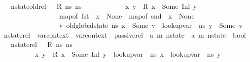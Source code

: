 \begin{isabellebody}
\ \ \ {\isachardoublequoteopen}nstate{\isacharunderscore}{\kern0pt}old{\isacharunderscore}{\kern0pt}rel\ {\isasymLambda}\ {\isasymLambda}{\isacharprime}{\kern0pt}\ R\ ns{}\ ns{}\ {\isacharequal}{\kern0pt}\ \isanewline
\ \ \ \ \ \ \ \ \ \ {\isacharparenleft}{\kern0pt}{\isasymforall}x\ y{\isachardot}{\kern0pt}\ \ R\ x\ {\isacharequal}{\kern0pt}\ Some\ {\isacharparenleft}{\kern0pt}Inl\ y{\isacharparenright}{\kern0pt}\ {\isasymlongrightarrow}\ \isanewline
\ \ \ \ \ \ \ \ \ \ \ \ \ \ \ \ \ {\isacharparenleft}{\kern0pt}map{\isacharunderscore}{\kern0pt}of\ {\isacharparenleft}{\kern0pt}fst\ {\isasymLambda}{\isacharparenright}{\kern0pt}\ x\ {\isasymnoteq}\ None\ {\isasymand}\ map{\isacharunderscore}{\kern0pt}of\ {\isacharparenleft}{\kern0pt}snd\ {\isasymLambda}{\isacharparenright}{\kern0pt}\ x\ {\isacharequal}{\kern0pt}\ None{\isacharparenright}{\kern0pt}\ {\isasymand}\isanewline
\ \ \ \ \ \ \ \ \ \ \ \ \ \ \ \ \ {\isacharparenleft}{\kern0pt}{\isasymexists}v{\isachardot}{\kern0pt}\ {\isacharparenleft}{\kern0pt}old{\isacharunderscore}{\kern0pt}global{\isacharunderscore}{\kern0pt}state\ ns{}{\isacharparenright}{\kern0pt}\ x\ {\isacharequal}{\kern0pt}\ Some\ v\ {\isasymand}\ lookup{\isacharunderscore}{\kern0pt}var\ {\isasymLambda}{\isacharprime}{\kern0pt}\ ns{}\ y\ {\isacharequal}{\kern0pt}\ Some\ v{\isacharparenright}{\kern0pt}{\isacharparenright}{\kern0pt}{\isachardoublequoteclose}\isanewline
\isanewline
{}\isamarkupfalse%
\ nstate{\isacharunderscore}{\kern0pt}rel\ {\isacharcolon}{\kern0pt}{\isacharcolon}{\kern0pt}\ {\isachardoublequoteopen}var{\isacharunderscore}{\kern0pt}context\ {\isasymRightarrow}\ var{\isacharunderscore}{\kern0pt}context\ {\isasymRightarrow}\ passive{\isacharunderscore}{\kern0pt}rel\ {\isasymRightarrow}\ {\isacharparenleft}{\kern0pt}{\isacharprime}{\kern0pt}a{\isacharcomma}{\kern0pt}\ {\isacharprime}{\kern0pt}m{\isacharparenright}{\kern0pt}\ nstate\ {\isasymRightarrow}\ {\isacharparenleft}{\kern0pt}{\isacharprime}{\kern0pt}a{\isacharcomma}{\kern0pt}\ {\isacharprime}{\kern0pt}m{\isacharparenright}{\kern0pt}\ nstate\ {\isasymRightarrow}\ bool{\isachardoublequoteclose}\isanewline
\ \ \ {\isachardoublequoteopen}nstate{\isacharunderscore}{\kern0pt}rel\ {\isasymLambda}\ {\isasymLambda}{\isacharprime}{\kern0pt}\ R\ ns{}\ ns{}\ {\isacharequal}{\kern0pt}\ \isanewline
\ \ \ \ \ \ \ \ \ \ {\isacharparenleft}{\kern0pt}{\isacharparenleft}{\kern0pt}{\isasymforall}x\ y{\isachardot}{\kern0pt}\ \ R\ x\ {\isacharequal}{\kern0pt}\ Some\ {\isacharparenleft}{\kern0pt}Inl\ y{\isacharparenright}{\kern0pt}\ {\isasymlongrightarrow}\ {\isacharparenleft}{\kern0pt}lookup{\isacharunderscore}{\kern0pt}var\ {\isasymLambda}\ ns{}\ x\ {\isacharequal}{\kern0pt}\ lookup{\isacharunderscore}{\kern0pt}var\ {\isasymLambda}{\isacharprime}{\kern0pt}\ ns{}\ y{\isacharparenright}{\kern0pt}{\isacharparenright}{\kern0pt}\isanewline

\end{isabellebody}

